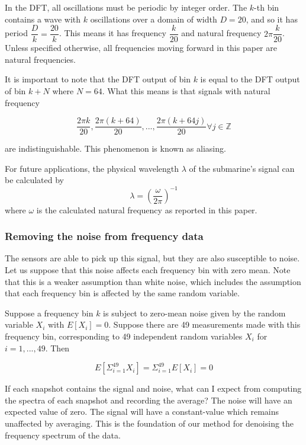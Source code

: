 \documentclass{article}
\begin{document}
In the DFT, all oscillations must be periodic by integer order. The $k$-th bin contains a wave with $k$ oscillations over a domain of width $D=20$, and so it has period $\dfrac{D}{k}=\dfrac{20}{k}$. This means it has frequency $\dfrac{k}{20}$ and natural frequency $2\pi\dfrac{k}{20}$. Unless specified otherwise, all frequencies moving forward in this paper are natural frequencies. 

It is important to note that the DFT output of bin $k$ is equal to the DFT output of bin $k+N$ where $N=64$. What this means is that signals with natural frequency

\begin{equation}
\dfrac{2\pi k}{20}, \dfrac{2\pi(k+64)}{20}, ..., \dfrac{2\pi(k+64j)}{20} \forall j \in \mathbb{Z}
\label{eqn:aliasing}
\end{equation}

are indistinguishable. This phenomenon is known as aliasing.

For future applications, the physical wavelength $\lambda$ of the submarine's signal can be calculated by
\begin{equation}
\lambda = (\dfrac{\omega}{2\pi})^{-1}
\label{eqn:wavelength}
\end{equation}
where $\omega$ is the calculated natural frequency as reported in this paper.

\subsubsection{Removing the noise from frequency data}

The sensors are able to pick up this signal, but they are also susceptible to noise. Let us suppose that this noise affects each frequency bin with zero mean. Note that this is a weaker assumption than white noise, which includes the assumption that each frequency bin is affected by the same random variable.

Suppose a frequency bin $k$ is subject to zero-mean noise given by the random variable $X_i$ with $E[X_i]=0$. Suppose there are 49 measurements made with this frequency bin, corresponding to 49 independent random variables $X_i$ for $i=1,...,49$. Then 

\begin{equation}
E[\Sigma_{i=1}^{49} X_i] = \Sigma_{i=1}^{49} E[X_i] = 0
\label{eqn:zeromean}
\end{equation}

If each snapshot contains the signal and noise, what can I expect from computing the spectra of each snapshot and recording the average? The noise will have an expected value of zero. The signal will have a constant-value which remains unaffected by averaging. This is the foundation of our method for denoising the frequency spectrum of the data.
\end{document}
